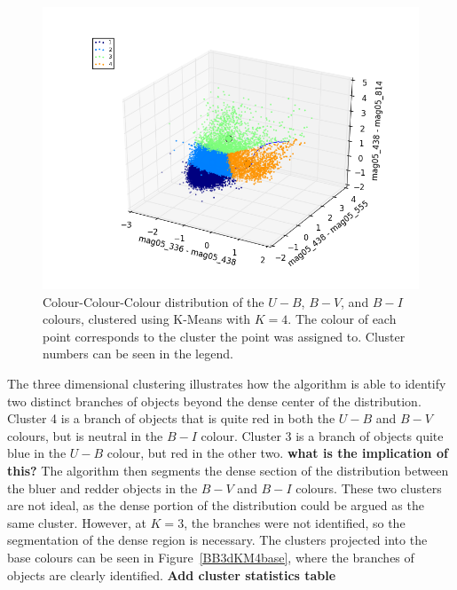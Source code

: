 \begin{figure}[H]
\centering
\includegraphics[width=\linewidth]{figs/broad/kmeans_3d_4cl_mag05_336-mag05_438vsmag05_438-mag05_555vsmag05_438-mag05_814}
\caption{Colour-Colour-Colour distribution of the $U - B$, $B - V$, and $B - I$ colours, clustered using K-Means with $K=4$. The colour of each point corresponds to the cluster the point was assigned to. Cluster numbers can be seen in the legend.}
\label{fig:BB3dKM4}
\end{figure}

The three dimensional clustering illustrates how the algorithm is able to identify two distinct branches of objects beyond the dense center of the distribution.
Cluster 4 is a branch of objects that is quite red in both the $U - B$ and $B - V$ colours, but is neutral in the $B - I$ colour.
Cluster 3 is a branch of objects quite blue in the $U - B$ colour, but red in the other two. \textbf{what is the implication of this?}
The algorithm then segments the dense section of the distribution between the bluer and redder objects in the $B - V$ and $B - I$ colours.
These two clusters are not ideal, as the dense portion of the distribution could be argued as the same cluster. 
However, at $K = 3$, the branches were not identified, so the segmentation of the dense region is necessary.
The clusters projected into the base colours can be seen in Figure~\ref{BB3dKM4base}, where the branches of objects are clearly identified.
\textbf{Add cluster statistics table}

